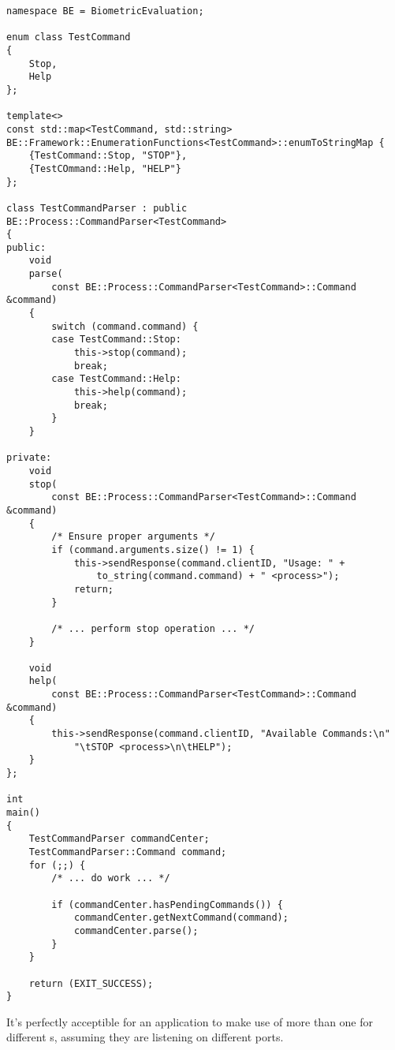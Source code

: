 \begin{lstlisting}[caption={Basic \class{CommandCenter} Usage}, label=lst:comand-center]
namespace BE = BiometricEvaluation;

enum class TestCommand
{
	Stop,
	Help
};

template<>
const std::map<TestCommand, std::string>
BE::Framework::EnumerationFunctions<TestCommand>::enumToStringMap {
	{TestCommand::Stop, "STOP"},
	{TestCOmmand::Help, "HELP"}
};

class TestCommandParser : public BE::Process::CommandParser<TestCommand>
{
public:
	void
	parse(
	    const BE::Process::CommandParser<TestCommand>::Command &command)
	{
		switch (command.command) {
		case TestCommand::Stop:
			this->stop(command);
			break;
		case TestCommand::Help:
			this->help(command);
			break;
		}
	}

private:
	void
	stop(
	    const BE::Process::CommandParser<TestCommand>::Command &command)
	{
		/* Ensure proper arguments */
		if (command.arguments.size() != 1) {
			this->sendResponse(command.clientID, "Usage: " +
			    to_string(command.command) + " <process>");
			return;
		}

		/* ... perform stop operation ... */
	}

	void
	help(
	    const BE::Process::CommandParser<TestCommand>::Command &command)
	{
		this->sendResponse(command.clientID, "Available Commands:\n"
		    "\tSTOP <process>\n\tHELP");
	}
};

int
main()
{
	TestCommandParser commandCenter;
	TestCommandParser::Command command;
	for (;;) {
		/* ... do work ... */
		
		if (commandCenter.hasPendingCommands()) {
			commandCenter.getNextCommand(command);
			commandCenter.parse();
		}
	}

	return (EXIT_SUCCESS);
}
\end{lstlisting}


It's perfectly acceptible for an application to make use of more than one
 for different s, assuming they are listening on 
different ports.

